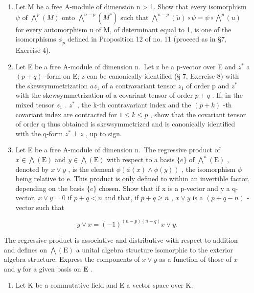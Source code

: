 \begin{enumerate}
\def\labelenumi{\arabic{enumi}.}
\setcounter{enumi}{13}
\item
  Let M be a free A-module of dimension n \textgreater{} 1. Show that every isomorphism \(\psi\) of \(\bigwedge^{p}(M)\) onto \(\bigwedge^{n-p}(M^{*})\) such that \(\bigwedge^{n-p}(\check{u}) \circ \psi = \psi \circ \bigwedge^{p}(u)\) for every automorphism u of M, of determinant equal to 1, is one of the isomorphisms \(\phi_{p}\) defined in Proposition 12 of no. 11 (proceed as in §7, Exercise 4).
\item
  Let E be a free A-module of dimension n.~Let z be a p-vector over E and \(z^{*}\) a \((p + q)\) -form on E; z can be canonically identified (§ 7, Exercise 8) with the skewsymmetrization \(az_{1}\) of a contravariant tensor \(z_{1}\) of order p and \(z^{*}\) with the skewsymmetrization of a covariant tensor of order \(p + q\) . If, in the mixed tensor \(z_{1}\) . \(z^{*}\) , the k-th contravariant index and the \((p + k)\) -th covariant index are contracted for \(1 \leqslant k \leqslant p\) , show that the covariant tensor of order q thus obtained is skewsymmetrized and is canonically identified with the q-form \(z^{*} \perp z\) , up to sign.
\item
  Let E be a free A-module of dimension n.~The regressive product of \(x \in \bigwedge(\mathrm{E})\) and \(y \in \bigwedge(\mathrm{E})\) with respect to a basis \(\{e\}\) of \(\bigwedge^{n}(\mathrm{E})\) , denoted by \(x \vee y\) , is the element \(\phi(\phi(x) \wedge \phi(y))\) , the isomorphism \(\phi\) being relative to e. This product is only defined to within an invertible factor, depending on the basis \(\{e\}\) chosen. Show that if x is a p-vector and y a q-vector, \(x \vee y = 0\) if \(p + q < n\) and that, if \(p + q \geqslant n\) , \(x \vee y\) is a \((p + q - n)\) -vector such that
\end{enumerate}

\[
y \vee x = (- 1) ^ {(n - p) (n - q)} x \vee y.
\]

The regressive product is associative and distributive with respect to addition and defines on \(\bigwedge(\mathrm{E})\) a unital algebra structure isomorphic to the exterior algebra structure. Express the components of \(x \vee y\) as a function of those of \(x\) and \(y\) for a given basis on \(\mathbf{E}\) .

\begin{enumerate}
\def\labelenumi{\arabic{enumi}.}
\setcounter{enumi}{16}
\tightlist
\item
  Let K be a commutative field and E a vector space over K.
\end{enumerate}


